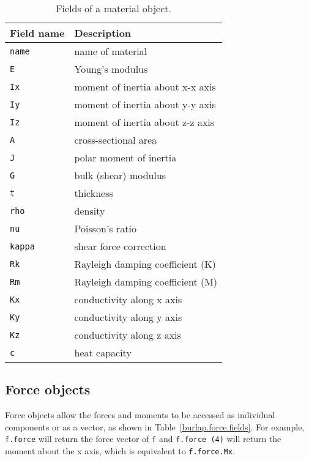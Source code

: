 {\scriptsize
\begin{table}[htbp]
\begin{center}
\begin{tabular}{l|l}
Field name	& Description				\\
\hline
\tt name	& name of material			\\
\tt E		& Young's modulus			\\
\tt Ix		& moment of inertia about x-x axis	\\
\tt Iy		& moment of inertia about y-y axis	\\
\tt Iz		& moment of inertia about z-z axis	\\
\tt A		& cross-sectional area			\\
\tt J		& polar moment of inertia		\\
\tt G		& bulk (shear) modulus			\\
\tt t		& thickness				\\
\tt rho		& density				\\
\tt nu		& Poisson's ratio			\\
\tt kappa	& shear force correction		\\
\tt Rk		& Rayleigh damping coefficient (K)	\\
\tt Rm		& Rayleigh damping coefficient (M)	\\
\tt Kx		& conductivity along x axis		\\
\tt Ky		& conductivity along y axis		\\
\tt Kz		& conductivity along z axis		\\
\tt c		& heat capacity				\\
\end{tabular}
\caption{Fields of a material object.}
\label{burlap.material.fields}
\end{center}
\end{table}}


\subsection{Force objects}

Force objects allow the forces and moments to be accessed as
individual components or as a vector, as shown in
Table~\ref{burlap.force.fields}.  For example, {\tt f.force} will
return the force vector of {\tt f} and {\tt f.force (4)} will return
the moment about the x axis, which is equivalent to {\tt f.force.Mx}.


